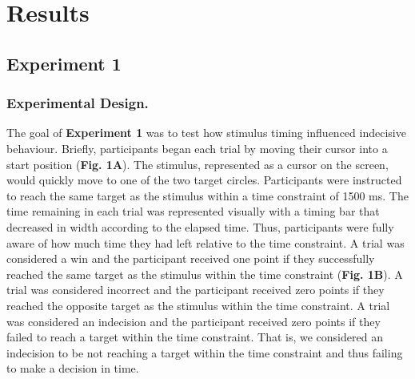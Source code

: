 \documentclass[man,donotrepeattitle,floatsintext,letterpaper,12pt]{apa7}
\newcommand\boldblue[1]{\textcolor{mydarkblue}{\textbf{#1}}}
\begin{document}
\vspace{2mm}
\section{Results}
\vspace{-1mm}

\subsection{Experiment 1}
\vspace{-1mm}

\subsubsection{Experimental Design.}

\noindent The goal of \boldblue{Experiment 1} was to test how stimulus timing influenced indecisive behaviour. Briefly, participants began each trial by moving their cursor into a start position (\boldblue{Fig. 1A}). The stimulus, represented as a cursor on the screen, would quickly move to one of the two target circles. Participants were instructed to reach the same target as the stimulus within a time constraint of 1500 ms. The time remaining in each trial was represented visually with a timing bar that decreased in width according to the elapsed time. Thus, participants were fully aware of how much time they had left relative to the time constraint. A trial was considered a win and the participant received one point if they successfully reached the same target as the stimulus within the time constraint (\boldblue{Fig. 1B}). A trial was considered incorrect and the participant received zero points if they reached the opposite target as the stimulus within the time constraint. A trial was considered an indecision and the participant received zero points if they failed to reach a target within the time constraint. That is, we considered an indecision to be not reaching a target within the time constraint and thus failing to make a decision in time.
\end{document}
